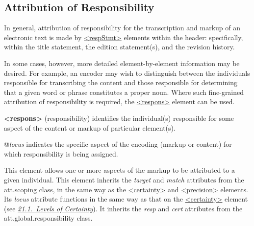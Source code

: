 \subsection[{Attribution of Responsibility}]{Attribution of Responsibility}\label{CERESP}\par
In general, attribution of responsibility for the transcription and markup of an electronic text is made by \hyperref[TEI.respStmt]{<respStmt>} elements within the header: specifically, within the title statement, the edition statement(s), and the revision history.\par
In some cases, however, more detailed element-by-element information may be desired. For example, an encoder may wish to distinguish between the individuals responsible for transcribing the content and those responsible for determining that a given word or phrase constitutes a proper noun. Where such fine-grained attribution of responsibility is required, the \hyperref[TEI.respons]{<respons>} element can be used. 
\begin{sansreflist}
  
\item [\textbf{<respons>}] (responsibility) identifies the individual(s) responsible for some aspect of the content or markup of particular element(s).\hfil\\[-10pt]\begin{sansreflist}
    \item[@{\itshape locus}]
  indicates the specific aspect of the encoding (markup or content) for which responsibility is being assigned.
\end{sansreflist}  
\end{sansreflist}
\par
This element allows one or more aspects of the markup to be attributed to a given individual. This element inherits the {\itshape target} and {\itshape match} attributes from the \textsf{att.scoping} class, in the same way as the \hyperref[TEI.certainty]{<certainty>} and \hyperref[TEI.precision]{<precision>} elements. Its {\itshape locus} attribute functions in the same way as that on the \hyperref[TEI.certainty]{<certainty>} element (see \textit{\hyperref[CECERT]{21.1.\ Levels of Certainty}}). It inherits the {\itshape resp} and {\itshape cert} attributes from the \textsf{att.global.responsibility} class.\par

